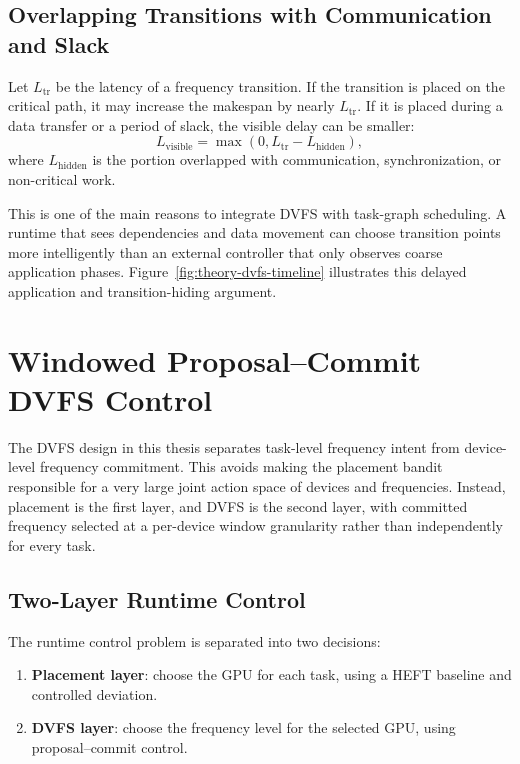 \subsection{Overlapping Transitions with Communication and Slack}
\label{subsec:overlap_transition_slack}

Let $L_{\mathrm{tr}}$ be the latency of a frequency transition. If the transition is placed on the critical path, it may increase the makespan by nearly $L_{\mathrm{tr}}$. If it is placed during a data transfer or a period of slack, the visible delay can be smaller:
\begin{equation}
L_{\mathrm{visible}} = \max(0, L_{\mathrm{tr}} - L_{\mathrm{hidden}}),
\label{eq:visible_transition_latency}
\end{equation}
where $L_{\mathrm{hidden}}$ is the portion overlapped with communication, synchronization, or non-critical work.

This is one of the main reasons to integrate DVFS with task-graph scheduling. A runtime that sees dependencies and data movement can choose transition points more intelligently than an external controller that only observes coarse application phases. Figure~\ref{fig:theory-dvfs-timeline} illustrates this delayed application and transition-hiding argument.

\figTheoryDvfsTimeline

\section{Windowed Proposal--Commit DVFS Control}
\label{sec:theory_proposal_commit}

The DVFS design in this thesis separates task-level frequency intent from device-level frequency commitment. This avoids making the placement bandit responsible for a very large joint action space of devices and frequencies. Instead, placement is the first layer, and DVFS is the second layer, with committed frequency selected at a per-device window granularity rather than independently for every task.

\subsection{Two-Layer Runtime Control}
\label{subsec:two_layer_control}

The runtime control problem is separated into two decisions:
\begin{enumerate}
    \item \textbf{Placement layer}: choose the GPU for each task, using a HEFT baseline and controlled deviation.
    \item \textbf{DVFS layer}: choose the frequency level for the selected GPU, using proposal--commit control.
\end{enumerate}

